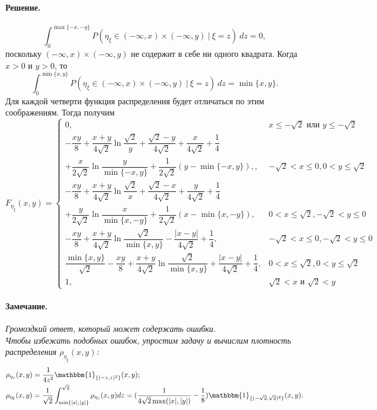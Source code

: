 \documentclass[specialist,
substylefile = spbu_report.rtx,
subf,href,colorlinks=true, 12pt]{disser}
\newenvironment{remark}{\paragraph{Замечание.}\itshape}{\hfill\\}
\newenvironment{solution}{\paragraph{Решение.}}{\hfill}
\begin{document}
\begin{solution}
		\begin{equation*}
			\int_0^{\max\{-x,-y\}}P(\eta_\xi\in (-\infty, x)\times(-\infty, y)~|~\xi=z)~dz = 0,
		\end{equation*}
		поскольку $(-\infty, x)\times(-\infty, y)$ не содержит в себе ни одного квадрата. Когда $x>0$ и $y>0$, то
		\begin{equation*}
			\int_0^{\min\{x,y\}}P(\eta_\xi\in (-\infty, x)\times(-\infty, y)~|~\xi=z)~dz = \min\{x,y\}.
		\end{equation*}
		Для каждой четверти функция распределения будет отличаться по этим соображениям. Тогда получим
		\begin{equation*}
			F_{\eta_\xi}(x,y) = 
			\begin{cases}
				0,& x\leqslant-\sqrt{2} \textrm{ или } y\leqslant-\sqrt{2}\\
				-\dfrac{xy}{8}+\dfrac{x+y}{4\sqrt{2}}\ln\dfrac{\sqrt{2}}{y}+\dfrac{\sqrt{2}-y}{4\sqrt{2}}+\dfrac{x}{4\sqrt{2}}+\dfrac{1}{4}\\+\dfrac{x}{2\sqrt{2}}\ln\dfrac{y}{\min\{-x,y\}}+\dfrac{1}{2\sqrt{2}}(y-\min\{-x,y\}),,&-\sqrt{2}<x\leqslant 0, 0<y\leqslant\sqrt{2}\\
				-\dfrac{xy}{8}+\dfrac{x+y}{4\sqrt{2}}\ln\dfrac{\sqrt{2}}{x}+\dfrac{\sqrt{2}-x}{4\sqrt{2}}+\dfrac{y}{4\sqrt{2}}+\dfrac{1}{4}\\+\dfrac{y}{2\sqrt{2}}\ln\dfrac{x}{\min\{x,-y\}}+\dfrac{1}{2\sqrt{2}}(x-\min\{x,-y\}),&0<x\leqslant\sqrt{2}, -\sqrt{2}<y\leqslant 0\\
				-\dfrac{xy}{8}+\dfrac{x+y}{4\sqrt{2}}\ln\dfrac{\sqrt{2}}{\min\{x,y\}}-\dfrac{|x-y|}{4\sqrt{2}}+\dfrac{1}{4},&-\sqrt{2}<x\leqslant0, -\sqrt{2}<y\leqslant0\\
				\dfrac{\min\{x,y\}}{\sqrt{2}}-\dfrac{xy}{8}+\dfrac{x+y}{4\sqrt{2}}\ln\dfrac{\sqrt{2}}{\min\{x,y\}}+\dfrac{|x-y|}{4\sqrt{2}}+\dfrac{1}{4},&0<x\leqslant\sqrt{2}, 0<y\leqslant\sqrt{2}\\
				1,& \sqrt{2}< x \textrm{ и } \sqrt{2}<y
			\end{cases}
		\end{equation*}
		\begin{remark}
			Громоздкий ответ, который может содержать ошибки.
		\end{remark}
		Чтобы избежать подобных ошибок, упростим задачу и вычислим плотность распределения $\rho_{\eta_\xi}(x,y)$:
		\begin{align}
			&\rho_{\eta_z}(x,y)=\dfrac{1}{4z^2}\mathbbm{1}_{\{(-z,z)^2\}}(x,y);\nonumber\\
			&\rho_{\eta_\xi}(x,y)=\dfrac{1}{\sqrt{2}}\int_{\min\{|x|,|y|\}}^{\sqrt{2}}\rho_{\eta_z}(x,y)dz=(\dfrac{1}{4\sqrt{2}\max(|x|,|y|)} - \dfrac{1}{8})\mathbbm{1}_{\{(-\sqrt{2},\sqrt{2})^2\}}(x,y).\label{eqn:main_prob}

\end{align}
\end{solution}
\end{document}

